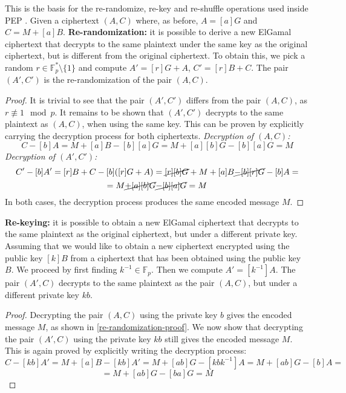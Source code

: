 \documentclass{report}
\begin{document}
This is the basis for the re-randomize, re-key and re-shuffle operations used inside PEP \cite{peppaper}.
\newline \newline
Given a ciphertext $(A, C)$ where, as before, $A=[a]G$ and $C=M+[a]B$.
\textbf{Re-randomization:} it is possible to derive a new ElGamal ciphertext that decrypts to the same plaintext under the same key as the original ciphertext, but is different
from the original ciphertext. To obtain this, we pick a random $r \in \mathds{F}^*_p \setminus \{1\}$ and compute $A'=[r]G+A$, $C'=[r]B+C$. The pair $(A', C')$ is the re-randomization of the pair $(A, C)$. \newline
\begin{proof} \label{re-randomization-proof}
		It is trivial to see that the pair $(A', C')$ differs from the pair $(A, C)$, as $r \not\equiv 1 \mod p$. It remains to be shown that $(A', C')$ decrypts
		to the same plaintext as $(A, C)$, when using the same key. This can be proven by explicitly carrying the decryption process for both ciphertexts. \newline
		\textit{Decryption of $(A, C)$:} \newline
		$$C-[b]A=M+[a]B-[b][a]G=M+[a][b]G-[b][a]G=M$$
\newline
		\textit{Decryption of $(A', C')$:} \newline
		$$C'-[b]A'=[r]B+C-[b]([r]G+A)=\cancel{[r][b]G}+M+[a]B \cancel{-[b][r]G}-[b]A=$$
		$$=M \cancel{+[a][b]G} \cancel{-[b][a]G}=M$$
\newline \newline
In both cases, the decryption process produces the same encoded message $M$.
\end{proof}

\textbf{Re-keying:} it is possible to obtain a new ElGamal ciphertext that decrypts to the same plaintext as the original ciphertext, but under a different private key. Assuming
that we would like to obtain a new ciphertext encrypted using the public key $[k]B$ from a ciphertext that has been obtained using the public key $B$. We proceed by first
finding $k^{-1} \in \mathds{F}_p$. Then we compute $A'=[k^{-1}]A$. The pair $(A', C)$ decrypts to the same plaintext as the pair $(A, C)$, but under a different private key $kb$.
\newline
\begin{proof}
		Decrypting the pair $(A, C)$ using the private key $b$ gives the encoded message $M$, as shown in \ref{re-randomization-proof}. We now show that decrypting the
		pair $(A', C)$ using the private key $kb$ still gives the encoded message $M$. This is again proved by explicitly writing the decryption process:
		$$C-[kb]A'=M+[a]B-[kb]A'=M+[ab]G-[kbk^{-1}]A=M+[ab]G-[b]A=$$
		$$=M+[ab]G-[ba]G=M$$
\end{proof}
\end{document}
